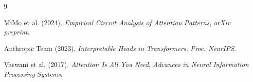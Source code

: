 \begin{thebibliography}{9}












MiMo et al. (2024). \emph{Empirical Circuit Analysis of Attention Patterns}, \textit{arXiv preprint}.












Anthropic Team (2023). \emph{Interpretable Heads in Transformers}, \textit{Proc. NeurIPS}.












Vaswani et al. (2017). \emph{Attention Is All You Need}, \textit{Advances in Neural Information Processing Systems}.






\end{thebibliography}





























































